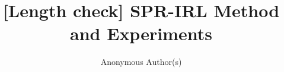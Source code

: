 \documentclass[sigconf,nonacm]{acmart}
\begin{document}
\title{[Length check] SPR-IRL Method and Experiments}
\author{Anonymous Author(s)}
\renewcommand{\shortauthors}{Anon.}
\maketitle




\end{document}
